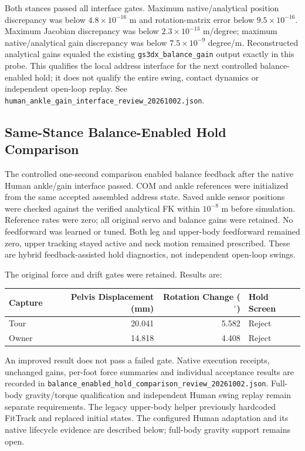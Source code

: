 \documentclass[11pt,a4paper]{article}
\begin{document}
Both stances passed all interface gates. Maximum native/analytical
position discrepancy was below $4.8\times10^{-16}$ m and rotation-matrix
error below $9.5\times10^{-16}$. Maximum Jacobian discrepancy was below
$2.3\times10^{-13}$ m/degree; maximum native/analytical gain discrepancy
was below $7.5\times10^{-9}$ degree/m. Reconstructed analytical gains
equaled the existing \texttt{gs3dx\_balance\_gain} output exactly in this
probe. This qualifies the local address interface for the next controlled
balance-enabled hold; it does not qualify the entire swing, contact
dynamics or independent open-loop replay. See
\texttt{human\_ankle\_gain\_interface\_review\_20261002.json}.


\subsection{Same-Stance Balance-Enabled Hold Comparison}
The controlled one-second comparison enabled balance feedback after the
native Human ankle/gain interface passed. COM and ankle references were
initialized from the same accepted assembled address state. Saved ankle
sensor positions were checked against the verified analytical FK within
$10^{-8}$ m before simulation. Reference rates were zero; all original
servo and balance gains were retained. No feedforward was learned or tuned.
Both leg and upper-body feedforward remained zero, upper tracking stayed
active and neck motion remained prescribed. These are hybrid
feedback-assisted hold diagnostics, not independent open-loop swings.

The original force and drift gates were retained. Results are:
\begin{center}
\begin{tabular}{lrrl}
\toprule
Capture & Pelvis Displacement (mm) & Rotation Change ($^\circ$) & Hold Screen \\
\midrule
Tour & 20.041 & 5.582 & Reject \\
Owner & 14.818 & 4.408 & Reject \\
\bottomrule
\end{tabular}
\end{center}
An improved result does not pass a failed gate. Native execution receipts,
unchanged gains, per-foot force summaries and individual acceptance results
are recorded in
\texttt{balance\_enabled\_hold\_comparison\_review\_20261002.json}.
Full-body gravity/torque qualification and independent Human swing replay
remain separate requirements. The legacy upper-body helper previously hardcoded FitTrack and replaced
initial states. The configured Human adaptation and its native lifecycle
evidence are described below; full-body gravity support remains open.
\end{document}
